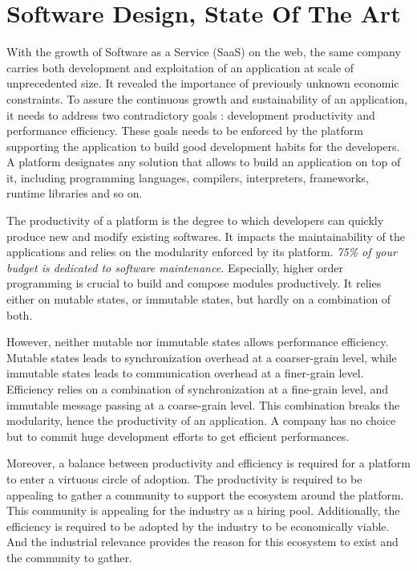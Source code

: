 \renewcommand{\glyph}{\iconfont{\XeTeXglyph190}}
\chapter{Software Design, State Of The Art} \label{chapter3}
\minitoc
\eject


With the growth of Software as a Service (SaaS) on the web, the same company carries both development and exploitation of an application at scale of unprecedented size.
It revealed the importance of previously unknown economic constraints.
To assure the continuous growth and sustainability of an application, it needs to address two contradictory goals : development productivity and performance efficiency.
These goals needs to be enforced by the platform supporting the application to build good development habits for the developers.
A platform designates any solution that allows to build an application on top of it, including programming languages, compilers, interpreters, frameworks, runtime libraries and so on.

The productivity of a platform is the degree to which developers can quickly produce new and modify existing softwares.
It impacts the maintainability of the applications and relies on the modularity enforced by its platform.
\textit{75\% of your budget is dedicated to software maintenance.}
Especially, higher order programming is crucial to build and compose modules productively.
It relies either on mutable states, or immutable states, but hardly on a combination of both.

However, neither mutable nor immutable states allows performance efficiency.
Mutable states leads to synchronization overhead at a coarser-grain level, while immutable states leads to communication overhead at a finer-grain level.
Efficiency relies on a combination of synchronization at a fine-grain level, and immutable message passing at a coarse-grain level.
This combination breaks the modularity, hence the productivity of an application.
A company has no choice but to commit huge development efforts to get efficient performances.

Moreover, a balance between productivity and efficiency is required for a platform to enter a virtuous circle of adoption.
The productivity is required to be appealing to gather a community to support the ecosystem around the platform.
This community is appealing for the industry as a hiring pool.
Additionally, the efficiency is required to be adopted by the industry to be economically viable.
And the industrial relevance provides the reason for this ecosystem to exist and the community to gather.


